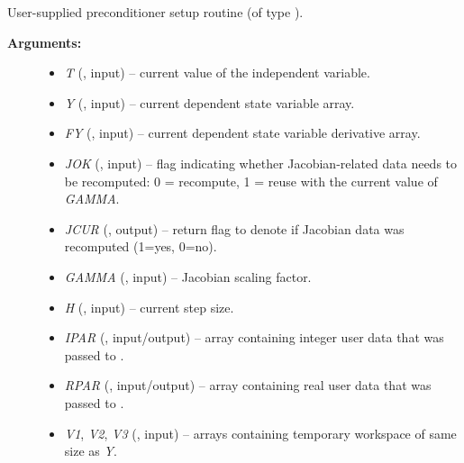 \documentclass[letterpaper,10pt,english]{sphinxmanual}
\begin{document}
\begin{fulllineitems}
\label{f_interface/Usage:f/_/FARKPSET}
User-supplied preconditioner setup routine (of type
{\hyperref[c_interface/User_supplied:ARKSpilsPrecSetupFn]{}}).
\begin{description}
\item[{\textbf{Arguments:}}] \leavevmode\begin{itemize}
\item {} 
\emph{T} (, input) -- current value of the independent variable.

\item {} 
\emph{Y} (, input) -- current dependent state variable array.

\item {} 
\emph{FY} (, input) -- current dependent state variable derivative array.

\item {} 
\emph{JOK} (, input) -- flag indicating whether Jacobian-related data needs to be
recomputed: 0 = recompute, 1 = reuse with the current value of \emph{GAMMA}.

\item {} 
\emph{JCUR} (, output) -- return flag to denote if
Jacobian data was recomputed (1=yes, 0=no).

\item {} 
\emph{GAMMA} (, input) -- Jacobian scaling factor.

\item {} 
\emph{H} (, input) -- current step size.

\item {} 
\emph{IPAR} (, input/output) -- array containing integer user data that was passed to
{\hyperref[f_interface/Usage:f/_/FARKMALLOC]{}}.

\item {} 
\emph{RPAR} (, input/output) -- array containing real user data that was passed to
{\hyperref[f_interface/Usage:f/_/FARKMALLOC]{}}.

\item {} 
\emph{V1}, \emph{V2}, \emph{V3} (, input) -- arrays containing temporary workspace of
same size as \emph{Y}.


\end{itemize}
\end{description}
\end{fulllineitems}
\end{document}
